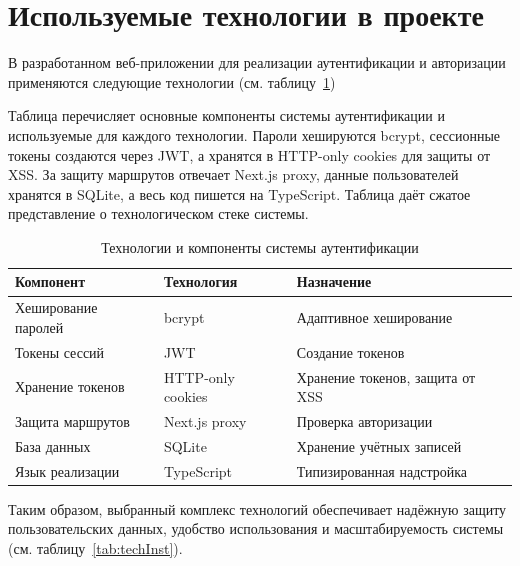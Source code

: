 \section{Используемые технологии в проекте}
В разработанном веб-приложении для реализации аутентификации и авторизации применяются следующие технологии (см. таблицу~\ref{tab:techComp})

Таблица перечисляет основные компоненты системы аутентификации и используемые для каждого технологии. Пароли хешируются bcrypt, сессионные токены создаются через JWT, а хранятся в HTTP-only cookies для защиты от XSS. За защиту маршрутов отвечает Next.js proxy, данные пользователей хранятся в SQLite, а весь код пишется на TypeScript. Таблица даёт сжатое представление о технологическом стеке системы.
\begin{table}[H]
\caption{\label{tab:techComp}Технологии и компоненты системы аутентификации}
\begin{small}
\begin{center}
\vspace{-0.5cm}\begin{tabular}{|l|l|l|}
\hline
Компонент & Технология & Назначение \\ \hline
Хеширование паролей & bcrypt & Адаптивное хеширование \\ \hline
Токены сессий & JWT & Создание токенов \\ \hline
Хранение токенов & HTTP-only cookies & Хранение токенов, защита от XSS \\ \hline
Защита маршрутов & Next.js proxy & Проверка авторизации \\ \hline
База данных & SQLite & Хранение учётных записей \\ \hline
Язык реализации & TypeScript & Типизированная надстройка \\ \hline
\end{tabular}
\end{center}
\end{small}
\end{table}

Таким образом, выбранный комплекс технологий обеспечивает надёжную защиту пользовательских данных, удобство использования и масштабируемость системы (см. таблицу~\ref{tab:techInst}).

